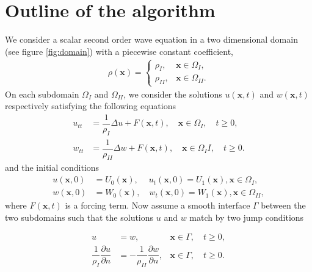 \documentclass[10pt,a4paper,twoside, french]{article}
\numberwithin{equation}{section}
\numberwithin{figure}{section}
\numberwithin{table}{section}
\newcommand{\bx}{\mathbf{x}}
\begin{document}
\section{Outline of the algorithm}
We consider a scalar second order wave equation in a two dimensional domain (see figure \ref{fig:domain}) with a piecewise constant coefficient,
\begin{align*}
\rho(\bx)=\left\lbrace
\begin{array}{cc}
\rho_I, & \bx\in\Omega_I, \\
\rho_{II}, & \bx\in\Omega_{II}.
\end{array}
\right.
\end{align*}
On each subdomain $\Omega_I$ and $\Omega_{II}$, we consider the solutions $u(\bx,t)$ and $w(\bx,t)$ respectively satisfying the following equations
\begin{align}
u_{tt} &= \dfrac{1}{\rho_I}\Delta u+F(\bx,t), \quad \bx\in\Omega_I,\quad t\geq 0,\\
w_{tt} &= \dfrac{1}{\rho_{II}}\Delta w+F(\bx,t), \quad \bx\in\Omega_{I}I,\quad t\geq 0.
\end{align}
and the initial conditions
\begin{align}
u(\bx,0) &= U_0(\bx),\quad ~u_t(\bx,0)=U_1(\bx), \bx\in\Omega_I, \\
w(\bx,0) &= W_0(\bx),\quad w_t(\bx,0)=W_1(\bx), \bx\in\Omega_{II},
\end{align}
where $F(\bx,t)$ is a forcing term. Now assume a smooth interface $\Gamma$ between the two subdomains such that the solutions $u$ and $w$ match by two jump conditions
\begin{center}
\begin{minipage}[c]{.5\textwidth}
\begin{align}
u &= w, &\bx\in\Gamma, \quad t\geq 0, \label{eq:jump_1} \\
\dfrac{1}{\rho_I}\dfrac{\partial u}{\partial n} &= -\dfrac{1}{\rho_{II}}\dfrac{\partial w}{\partial n}, &\bx\in\Gamma, \quad t\geq 0.
\label{eq:jump_2}
\end{align}
\end{minipage}
\end{center}

\begin{center}
\vspace{.5cm}
\begin{minipage}[c]{0.5\textwidth}
\centering
{}
\label{fig:domain}
\end{minipage}
\end{center}
\end{document}
